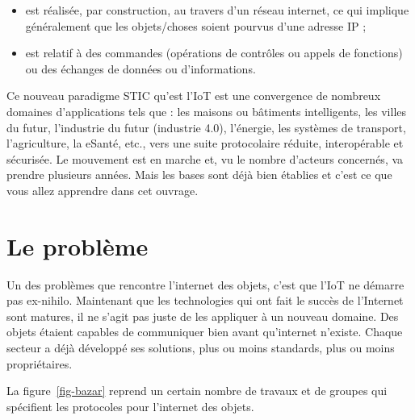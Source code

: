 \begin{itemize}
    \item est réalisée, par construction, au travers d’un réseau internet, ce qui implique généralement que les objets/choses soient pourvus d’une adresse IP ;
    \item est relatif à des commandes (opérations de contrôles ou appels de fonctions) ou des échanges de données ou d’informations.
\end{itemize}

  \vspace{1em}


Ce nouveau paradigme \ac{STIC} qu’est l’IoT est une convergence de nombreux domaines d’applications tels que : les maisons ou bâtiments intelligents, les villes du futur, l’industrie du futur (industrie 4.0), l’énergie, les systèmes de transport, l’agriculture, la eSanté, etc., vers une suite protocolaire réduite, interopérable et sécurisée. Le mouvement est en marche et, vu le nombre d'acteurs concernés, va prendre plusieurs années. Mais les bases sont déjà bien établies et c'est ce que vous allez apprendre dans cet ouvrage.

 \vspace{2em}
 
\section{Le problème}

  \vspace{1em}

Un des problèmes que rencontre l’internet des objets, c’est que l’IoT ne démarre pas ex-nihilo. Maintenant que les technologies qui ont fait le succès de l'Internet sont matures, il ne s'agit pas juste de les appliquer à un nouveau domaine. Des objets étaient capables de communiquer bien avant qu’internet n’existe. Chaque secteur a déjà développé ses solutions, plus ou moins standards, plus ou moins propriétaires.

La figure~\vref{fig-bazar} reprend un certain nombre de travaux et de groupes qui spécifient les protocoles pour l’internet des objets. 

